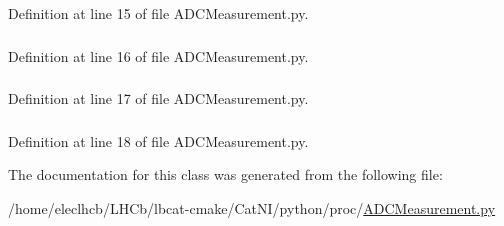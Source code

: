 Definition at line 15 of file ADCMeasurement.py.\hypertarget{classADCMeasurement_1_1CurrentMeasurement_a6bbff53922d9b1856c15bc498e398ccd}{
\subsubsection[{s2}]{}}
\label{classADCMeasurement_1_1CurrentMeasurement_a6bbff53922d9b1856c15bc498e398ccd}


Definition at line 16 of file ADCMeasurement.py.\hypertarget{classADCMeasurement_1_1CurrentMeasurement_a023e08fd2ab52d3a566a7fe2b5ea4919}{
\subsubsection[{s3}]{}}
\label{classADCMeasurement_1_1CurrentMeasurement_a023e08fd2ab52d3a566a7fe2b5ea4919}


Definition at line 17 of file ADCMeasurement.py.\hypertarget{classADCMeasurement_1_1CurrentMeasurement_ad4afef9a3c92f52001ed0f7a935c49a0}{
\subsubsection[{s4}]{}}
\label{classADCMeasurement_1_1CurrentMeasurement_ad4afef9a3c92f52001ed0f7a935c49a0}


Definition at line 18 of file ADCMeasurement.py.

The documentation for this class was generated from the following file:\begin{DoxyCompactItemize}
\item 
/home/eleclhcb/LHCb/lbcat-\/cmake/CatNI/python/proc/\hyperlink{ADCMeasurement_8py}{ADCMeasurement.py}\end{DoxyCompactItemize}
